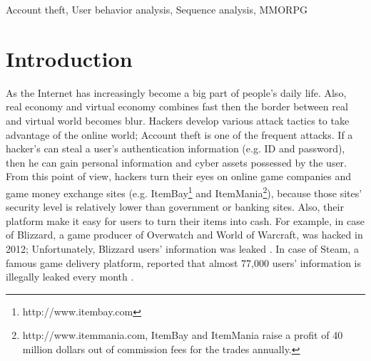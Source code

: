 \documentclass[conference]{IEEEtran}
\begin{document}
\begin{IEEEkeywords}
Account theft, User behavior analysis, Sequence analysis, MMORPG
\end{IEEEkeywords}


\IEEEpeerreviewmaketitle


\section{Introduction}
As the Internet has increasingly become a big part of people's daily life. Also, real economy and virtual economy combines fast then the border between real and virtual world becomes blur. 
Hackers develop various attack tactics to take advantage of the online world; Account theft is one of the frequent attacks. If a hacker's can steal a user's authentication information (e.g. ID and password), then he can gain personal information and cyber assets possessed by the user. From this point of view, hackers turn their eyes on online game companies and game money exchange sites (e.g. ItemBay\footnote{http://www.itembay.com} and ItemMania\footnote{http://www.itemmania.com, ItemBay and ItemMania raise a profit of 40 million dollars out of commission fees for the trades annually.}), because those sites' security level is relatively lower than government or banking sites. Also, their platform make it easy for users to turn their items into cash. %
For example, in case of Blizzard, a game producer of Overwatch and World of Warcraft, was hacked in 2012; Unfortunately, Blizzard users' information was leaked \cite{IEEEhowto:news2}. In case of Steam, a famous game delivery platform, reported that almost 77,000 users' information is illegally leaked every month \cite{IEEEhowto:news3}. 

\end{document}
